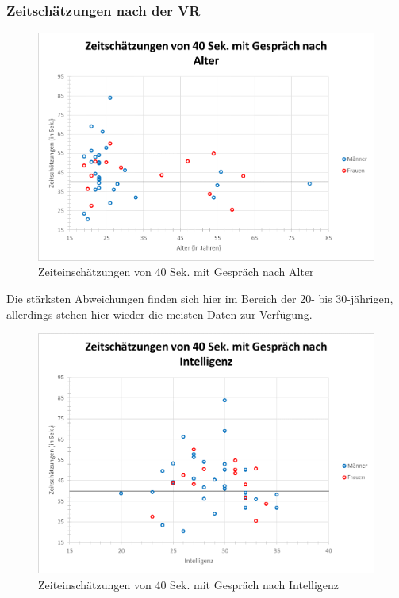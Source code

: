 \documentclass{Paper}
\begin{document}
\subsubsection{Zeitschätzungen nach der VR}

\begin{figure}[H]
	\centering
	\includegraphics[scale=0.7]{../Diagramme/scatterPre/40mit_alter.png}
	\caption{Zeiteinschätzungen von 40 Sek. mit Gespräch nach Alter}
	\label{img:alter40mit}
\end{figure}

Die stärksten Abweichungen finden sich hier im Bereich der 20- bis 30-jährigen, allerdings stehen hier wieder die meisten Daten zur Verfügung. 


\begin{figure}[H]
	\centering
	\includegraphics[scale=0.7]{../Diagramme/scatterPre/40mit_intelligenz.png}
	\caption{Zeiteinschätzungen von 40 Sek. mit Gespräch nach Intelligenz}
	\label{img:intell40mit}
\end{figure}
\end{document}
